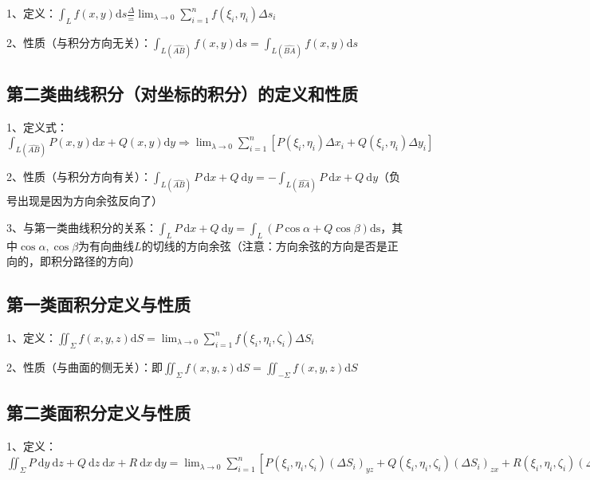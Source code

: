 1、定义：$ \int_{L} f(x, y) \mathrm{d} s\frac{\Delta}{=} \lim _{\lambda \rightarrow 0} \sum_{i=1}^{n} f\left(\xi_{i}, \eta_{i}\right) \Delta s_{i} $

2、性质（与积分方向无关）：$ \int_{L(\widehat{A B})} f(x, y) \mathrm{d} s=\int_{L(\widehat{B A})} f(x, y) \mathrm{d} s $



\subsection{第二类曲线积分（对坐标的积分）的定义和性质}

1、定义式：$ \int_{L(\widehat{A B})} P(x, y) \mathrm{d} x+Q(x, y) \mathrm{d} y \Longrightarrow \lim_{\lambda \rightarrow 0} \sum_{i=1}^{n}\left[P\left(\xi_{i}, \eta_{i}\right) \Delta x_{i}+Q\left(\xi_{i}, \eta_{i}\right) \Delta y_{i}\right] $

2、性质（与积分方向有关）：$ \int_{L(\widehat{A B})} P \mathrm{~d} x+Q \mathrm{~d} y=-\int_{L(\widehat{B A})} P \mathrm{~d} x+Q \mathrm{~d} y $（负号出现是因为方向余弦反向了）

3、与第一类曲线积分的关系：$ \int_{L} P \mathrm{~d} x+Q \mathrm{~d} y=\int_{L}(P \cos \alpha+Q \cos \beta) \mathrm{ds} $，其中$ \cos \alpha, \cos \beta $为有向曲线$ L $的切线的方向余弦（注意：方向余弦的方向是否是正向的，即积分路径的方向）



\subsection{第一类面积分定义与性质}

1、定义：$ \iint_{\Sigma} f(x, y, z) \mathrm{d} S=\lim_{\lambda \rightarrow 0} \sum_{i=1}^{n} f\left(\xi_{i}, \eta_{i}, \zeta_{i}\right) \Delta S_{i} $

2、性质（与曲面的侧无关）：即$ \iint_{\Sigma} f(x, y, z) \mathrm{d} S=\iint_{-\Sigma} f(x, y, z) \mathrm{d} S $



\subsection{第二类面积分定义与性质}

1、定义：$ \iint_{\Sigma} P \mathrm{~d} y \mathrm{~d} z+Q \mathrm{~d} z \mathrm{~d} x+R \mathrm{~d} x \mathrm{~d} y=\lim _{\lambda \rightarrow 0} \sum_{i=1}^{n}[P\left(\xi_{i}, \eta_{i}, \zeta_{i}\right)\left(\Delta S_{i}\right)_{y z}+Q\left(\xi_{i}, \eta_{i}, \zeta_{i}\right)\left(\Delta S_{i}\right)_{z x}+R\left(\xi_{i}, \eta_{i}, \zeta_{i}\right)\left(\Delta S_{i}\right)_{x y}] $

